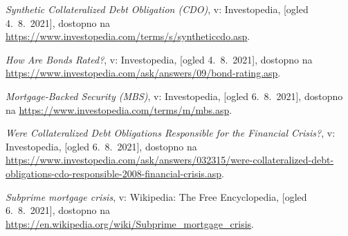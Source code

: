 \documentclass[12pt,a4paper]{amsart}
\theoremstyle{definition} %
\theoremstyle{plain} %
\begin{document}
\begin{thebibliography}{99}
\emph{Synthetic Collateralized Debt Obligation (CDO)}, v: Investopedia, [ogled 4.~8.~2021], dostopno na \url{https://www.investopedia.com/terms/s/syntheticcdo.asp}.

\emph{How Are Bonds Rated?}, v: Investopedia, [ogled 4.~8.~2021], dostopno na \url{https://www.investopedia.com/ask/answers/09/bond-rating.asp}.

\emph{Mortgage-Backed Security (MBS)}, v: Investopedia, [ogled 6.~8.~2021], dostopno na \url{https://www.investopedia.com/terms/m/mbs.asp}.

\emph{Were Collateralized Debt Obligations Responsible for the Financial Crisis?}, v: Investopedia, [ogled 6.~8.~2021], dostopno na \url{https://www.investopedia.com/ask/answers/032315/were-collateralized-debt-obligations-cdo-responsible-2008-financial-crisis.asp}.

\emph{Subprime mortgage crisis}, v: Wikipedia: The Free Encyclopedia, [ogled 6.~8.~2021], dostopno na \url{https://en.wikipedia.org/wiki/Subprime_mortgage_crisis}.

\end{thebibliography}


\end{document}
